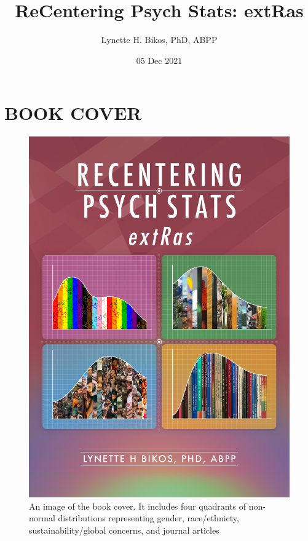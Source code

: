 \documentclass[
]{book}
\title{ReCentering Psych Stats: extRas}
\author{Lynette H. Bikos, PhD, ABPP}
\date{05 Dec 2021}
\begin{document}
\maketitle

{
\setcounter{tocdepth}{1}
\tableofcontents
}
\hypertarget{book-cover}{%
\chapter*{BOOK COVER}\label{book-cover}}

\begin{figure}
\centering
\includegraphics{images/ReCenterPsychStats-extRas-bookcover.png}
\caption{An image of the book cover. It includes four quadrants of non-normal distributions representing gender, race/ethnicty, sustainability/global concerns, and journal articles}
\end{figure}
\end{document}
